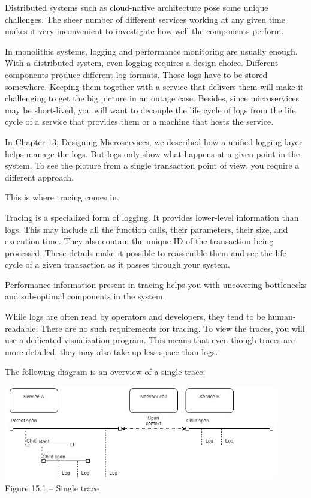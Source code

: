 
Distributed systems such as cloud-native architecture pose some unique challenges. The sheer number of different services working at any given time makes it very inconvenient to investigate how well the components perform.

In monolithic systems, logging and performance monitoring are usually enough. With a distributed system, even logging requires a design choice. Different components produce different log formats. Those logs have to be stored somewhere. Keeping them together with a service that delivers them will make it challenging to get the big picture in an outage case. Besides, since microservices may be short-lived, you will want to decouple the life cycle of logs from the life cycle of a service that provides them or a machine that hosts the service.

In Chapter 13, Designing Microservices, we described how a unified logging layer helps manage the logs. But logs only show what happens at a given point in the system. To see the picture from a single transaction point of view, you require a different approach.

This is where tracing comes in.


Tracing is a specialized form of logging. It provides lower-level information than logs. This may include all the function calls, their parameters, their size, and execution time. They also contain the unique ID of the transaction being processed. These details make it possible to reassemble them and see the life cycle of a given transaction as it passes through your system. 

Performance information present in tracing helps you with uncovering bottlenecks and sub-optimal components in the system.

While logs are often read by operators and developers, they tend to be human-readable. There are no such requirements for tracing. To view the traces, you will use a dedicated visualization program. This means that even though traces are more detailed, they may also take up less space than logs.

The following diagram is an overview of a single trace:

\begin{center}
\includegraphics[width=0.9\textwidth]{content/4/chapter15/images/1.jpg}\\
Figure 15.1 – Single trace 
\end{center}

